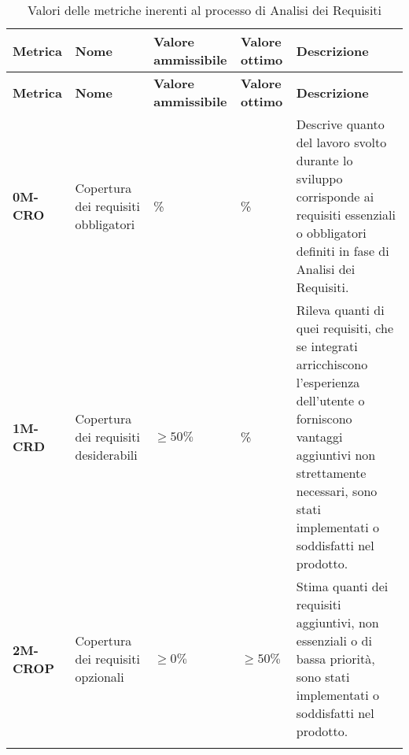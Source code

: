 \begin{longtable}{|>{\centering\arraybackslash}p{}|>{\centering\arraybackslash}p{}|>{\centering\arraybackslash}p{}|>{\centering\arraybackslash}p{}|>{\centering\arraybackslash}p{}|}
	\hline
	\textbf{Metrica} & \textbf{Nome}                        & \textbf{Valore ammissibile} & \textbf{Valore ottimo} & \textbf{Descrizione}                                                                                                                                                                                      \\
	\hline
	\endfirsthead
	\hline
	\textbf{Metrica} & \textbf{Nome}                        & \textbf{Valore ammissibile} & \textbf{Valore ottimo} & \textbf{Descrizione}                                                                                                                                                                                      \\
	\endhead
	\textbf{0M-CRO}  & Copertura dei requisiti obbligatori  & 100\%                       & 100\%                  & Descrive quanto del lavoro svolto durante lo sviluppo corrisponde ai requisiti essenziali o obbligatori definiti in fase di Analisi dei Requisiti.                                                        \\
	\hline
	\textbf{1M-CRD}  & Copertura dei requisiti desiderabili & $\geq 50\% $                & 100\%                  & Rileva quanti di quei requisiti, che se integrati arricchiscono l'esperienza dell'utente o forniscono vantaggi aggiuntivi non strettamente necessari, sono stati implementati o soddisfatti nel prodotto. \\
	\hline
	\textbf{2M-CROP} & Copertura dei requisiti opzionali    & $\geq 0\% $                 & $\geq 50\% $           & Stima quanti dei requisiti aggiuntivi, non essenziali o di bassa priorità, sono stati implementati o soddisfatti nel prodotto.                                                                            \\
	\hline
	\caption{ Valori delle metriche inerenti al processo di Analisi dei Requisiti}
	\label{table:1}
\end{longtable}

